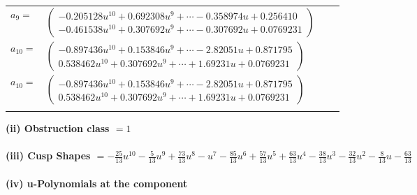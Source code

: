 \documentclass[1p]{elsarticle_modified}
\theoremstyle{definition}
\begin{document}
\begin{tabular}{m{7pt} m{180pt} m{7pt} m{180pt} }
\flushright $a_{9}=$&$\begin{pmatrix}-0.205128 u^{10}+0.692308 u^{9}+\cdots-0.358974 u+0.256410\\-0.461538 u^{10}+0.307692 u^{9}+\cdots-0.307692 u+0.0769231\end{pmatrix}$ \\
\flushright $a_{10}=$&$\begin{pmatrix}-0.897436 u^{10}+0.153846 u^{9}+\cdots-2.82051 u+0.871795\\0.538462 u^{10}+0.307692 u^{9}+\cdots+1.69231 u+0.0769231\end{pmatrix}$\\ \flushright $a_{10}=$&$\begin{pmatrix}-0.897436 u^{10}+0.153846 u^{9}+\cdots-2.82051 u+0.871795\\0.538462 u^{10}+0.307692 u^{9}+\cdots+1.69231 u+0.0769231\end{pmatrix}$\\&\end{tabular}
\flushleft \textbf{(ii) Obstruction class $= 1$}\\~\\
\flushleft \textbf{(iii) Cusp Shapes $= -\frac{25}{13} u^{10}-\frac{5}{13} u^9+\frac{73}{13} u^8- u^7-\frac{85}{13} u^6+\frac{57}{13} u^5+\frac{63}{13} u^4-\frac{38}{13} u^3-\frac{32}{13} u^2-\frac{8}{13} u-\frac{63}{13}$}\\~\\
\newpage\renewcommand{\arraystretch}{1}
\flushleft \textbf{(iv) u-Polynomials at the component}\newline \\
\end{document}
